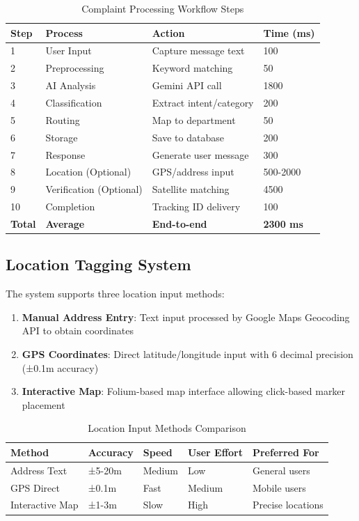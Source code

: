 \documentclass[11pt,a4paper]{article}
\begin{document}
\begin{table}[H]
\centering
\caption{Complaint Processing Workflow Steps}
\label{tab:workflow}
\begin{tabular}{|l|l|p{5cm}|l|}
\hline
\textbf{Step} & \textbf{Process} & \textbf{Action} & \textbf{Time (ms)} \\
\hline
1 & User Input & Capture message text & 100 \\
2 & Preprocessing & Keyword matching & 50 \\
3 & AI Analysis & Gemini API call & 1800 \\
4 & Classification & Extract intent/category & 200 \\
5 & Routing & Map to department & 50 \\
6 & Storage & Save to database & 200 \\
7 & Response & Generate user message & 300 \\
8 & Location (Optional) & GPS/address input & 500-2000 \\
9 & Verification (Optional) & Satellite matching & 4500 \\
10 & Completion & Tracking ID delivery & 100 \\
\hline
\textbf{Total} & \textbf{Average} & \textbf{End-to-end} & \textbf{2300 ms} \\
\hline
\end{tabular}
\end{table}

\subsection{Location Tagging System}

The system supports three location input methods:

\begin{enumerate}
    \item \textbf{Manual Address Entry}: Text input processed by Google Maps Geocoding API to obtain coordinates
    \item \textbf{GPS Coordinates}: Direct latitude/longitude input with 6 decimal precision (±0.1m accuracy)
    \item \textbf{Interactive Map}: Folium-based map interface allowing click-based marker placement
\end{enumerate}

\begin{table}[H]
\centering
\caption{Location Input Methods Comparison}
\label{tab:location_methods}
\begin{tabular}{|l|l|l|l|l|}
\hline
\textbf{Method} & \textbf{Accuracy} & \textbf{Speed} & \textbf{User Effort} & \textbf{Preferred For} \\
\hline
Address Text & ±5-20m & Medium & Low & General users \\
GPS Direct & ±0.1m & Fast & Medium & Mobile users \\
Interactive Map & ±1-3m & Slow & High & Precise locations \\
\hline
\end{tabular}
\end{table}
\end{document}
